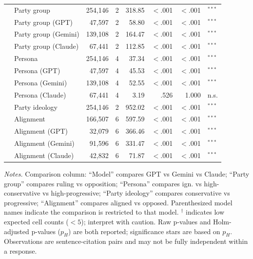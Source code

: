 \begin{table}[t]
\begin{tabular}{llrrrrrl}
 & Party group & 254{,}146 & 2 & 318.85 & $<$.001 & $<$.001 & $^{***}$ \\
 & Party group (GPT) & 47{,}597 & 2 & 58.80 & $<$.001 & $<$.001 & $^{***}$ \\
 & Party group (Gemini) & 139{,}108 & 2 & 164.47 & $<$.001 & $<$.001 & $^{***}$ \\
 & Party group (Claude) & 67{,}441 & 2 & 112.85 & $<$.001 & $<$.001 & $^{***}$ \\
 & Persona & 254{,}146 & 4 & 37.34 & $<$.001 & $<$.001 & $^{***}$ \\
 & Persona (GPT) & 47{,}597 & 4 & 45.53 & $<$.001 & $<$.001 & $^{***}$ \\
 & Persona (Gemini) & 139{,}108 & 4 & 52.55 & $<$.001 & $<$.001 & $^{***}$ \\
 & Persona (Claude) & 67{,}441 & 4 & 3.19 & .526 & 1.000 & n.s. \\
 & Party ideology & 254{,}146 & 2 & 952.02 & $<$.001 & $<$.001 & $^{***}$ \\
 & Alignment & 166{,}507 & 6 & 597.59 & $<$.001 & $<$.001 & $^{***}$ \\
 & Alignment (GPT) & 32{,}079 & 6 & 366.46 & $<$.001 & $<$.001 & $^{***}$ \\
 & Alignment (Gemini) & 91{,}596 & 6 & 331.47 & $<$.001 & $<$.001 & $^{***}$ \\
 & Alignment (Claude) & 42{,}832 & 6 & 71.87 & $<$.001 & $<$.001 & $^{***}$ \\
\bottomrule
\end{tabular}
\begin{minipage}{\columnwidth}
\footnotesize \textit{Notes.} Comparison column: ``Model'' compares GPT vs Gemini vs Claude; ``Party group'' compares ruling vs opposition; ``Persona'' compares ign. vs high-conservative vs high-progressive; ``Party ideology'' compares conservative vs progressive; ``Alignment'' compares aligned vs opposed. Parenthesized model names indicate the comparison is restricted to that model. $^\dagger$ indicates low expected cell counts ($<5$); interpret with caution. Raw p-values and Holm-adjusted p-values ($p_H$) are both reported; significance stars are based on $p_H$. Observations are sentence-citation pairs and may not be fully independent within a response.
\end{minipage}
\end{table}
